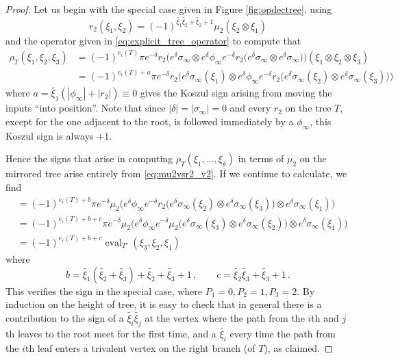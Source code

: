 \documentclass[english,letter paper,12pt,leqno]{article}
\theoremstyle{example}
\numberwithin{equation}{section}
\def\be{\begin{equation}}
\def\ee{\end{equation}}
\begin{document}
\begin{proof}
Let us begin with the special case given in Figure \ref{fig:opdectree}, using
\be\label{eq:mu2vsr2_v2}
r_2( \xi_1, \xi_2 ) = (-1)^{\widetilde{\xi_1} \widetilde{\xi_2} + \widetilde{\xi_2} + 1}
\mu_2(\xi_2 \otimes \xi_1)
\ee
and the operator given in \eqref{eq:explicit_tree_operator} to compute that
\begin{align*}
\rho_T( \xi_1, \xi_2, \xi_3 ) &= (-1)^{e_i(T)} \pi e^{-\delta} r_2\Big( e^{\delta}\sigma_\infty \otimes e^{\delta} \phi_\infty e^{-\delta} r_2\Big( e^{\delta} \sigma_\infty \otimes e^{\delta} \sigma_\infty \Big) \Big)( \xi_1 \otimes \xi_2 \otimes \xi_3 )\\
&= (-1)^{e_i(T) + a} \pi e^{-\delta} r_2\Big( e^{\delta}\sigma_\infty(\xi_1) \otimes e^{\delta} \phi_\infty e^{-\delta} r_2\Big( e^{\delta} \sigma_\infty(\xi_2) \otimes e^{\delta} \sigma_\infty(\xi_3) \Big) \Big)
\end{align*}
where $a = \widetilde{\xi_1}( |\phi_\infty| + |r_2| ) \equiv 0$ gives the Koszul sign arising from moving the inputs ``into position''. Note that since $|\delta| = |\sigma_\infty| = 0$ and every $r_2$ on the tree $T$, except for the one adjacent to the root, is followed immediately by a $\phi_\infty$, this Koszul sign is always $+1$.

Hence the signs that arise in computing $\rho_T(\xi_1,\ldots,\xi_k)$ in terms of $\mu_2$ on the mirrored tree arise entirely from \eqref{eq:mu2vsr2_v2}. If we continue to calculate, we find
\begin{align*}
&= (-1)^{e_i(T) + b} \pi e^{-\delta} \mu_2\Big( e^{\delta} \phi_\infty e^{-\delta} r_2\Big( e^{\delta} \sigma_\infty(\xi_2) \otimes e^{\delta} \sigma_\infty(\xi_3) \Big) \otimes e^{\delta}\sigma_\infty(\xi_1) \Big)\\
&= (-1)^{e_i(T) + b + c} \pi e^{-\delta} \mu_2\Big( e^{\delta} \phi_\infty e^{-\delta} \mu_2\Big( e^{\delta} \sigma_\infty(\xi_3) \otimes e^{\delta} \sigma_\infty(\xi_2) \Big) \otimes e^{\delta}\sigma_\infty(\xi_1) \Big)\\
&= (-1)^{e_i(T) + b + c} \operatorname{eval}_{T'}( \xi_3, \xi_2, \xi_1 )
\end{align*}
where
\[
b = \widetilde{\xi_1}( \widetilde{\xi_2} + \widetilde{\xi_3} ) + \widetilde{\xi_2} + \widetilde{\xi_3} + 1\,, \qquad c = \widetilde{\xi_2}\widetilde{\xi_3} + \widetilde{\xi_3} + 1\,.
\]
This verifies the sign in the special case, where $P_1 = 0, P_2 = 1, P_3 = 2$. By induction on the height of tree, it is easy to check that in general there is a contribution to the sign of a $\widetilde{\xi_i}\widetilde{\xi_j}$ at the vertex where the path from the $i$th and $j$th leaves to the root meet for the first time, and a $\widetilde{\xi_i}$ every time the path from the $i$th leaf enters a trivalent vertex on the right branch (of $T$), as claimed.
\end{proof}
\end{document}
